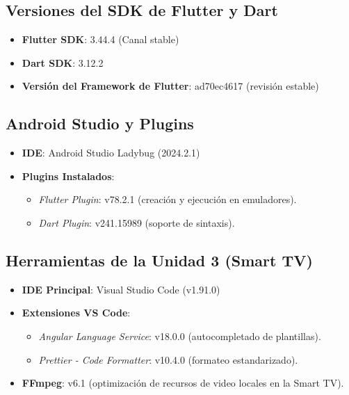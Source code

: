 \documentclass[11pt,a4paper]{article}
\begin{document}
\subsection{Versiones del SDK de Flutter y Dart}
\begin{itemize}
    \item \textbf{Flutter SDK}: 3.44.4 (Canal stable)
    \item \textbf{Dart SDK}: 3.12.2
    \item \textbf{Versión del Framework de Flutter}: ad70ec4617 (revisión estable)
\end{itemize}

\subsection{Android Studio y Plugins}
\begin{itemize}
    \item \textbf{IDE}: Android Studio Ladybug (2024.2.1)
    \item \textbf{Plugins Instalados}:
    \begin{itemize}
        \item \textit{Flutter Plugin}: v78.2.1 (creación y ejecución en emuladores).
        \item \textit{Dart Plugin}: v241.15989 (soporte de sintaxis).
    \end{itemize}
\end{itemize}

\subsection{Herramientas de la Unidad 3 (Smart TV)}
\begin{itemize}
    \item \textbf{IDE Principal}: Visual Studio Code (v1.91.0)
    \item \textbf{Extensiones VS Code}:
    \begin{itemize}
        \item \textit{Angular Language Service}: v18.0.0 (autocompletado de plantillas).
        \item \textit{Prettier - Code Formatter}: v10.4.0 (formateo estandarizado).
    \end{itemize}
    \item \textbf{FFmpeg}: v6.1 (optimización de recursos de video locales en la Smart TV).
\end{itemize}
\end{document}
